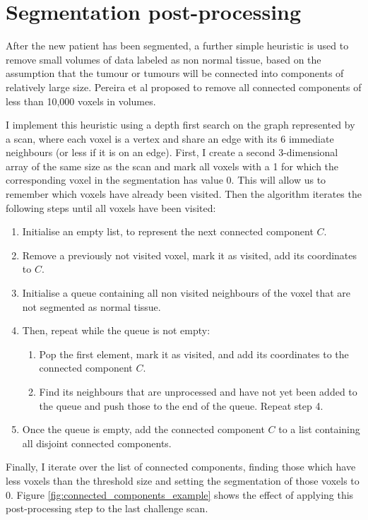 \documentclass[12pt,a4paper,twoside,openright]{report}
\begin{document}
\section{Segmentation post-processing}
After the new patient has been segmented, a further simple heuristic is used to remove small volumes of data labeled as non normal tissue, based on the assumption that the tumour or tumours will be connected into components of relatively large size. Pereira et al \cite{pereira} proposed to remove all connected components of less than 10,000 voxels in volumes.

I implement this heuristic using a depth first search on the graph represented by a scan, where each voxel is a vertex and share an edge with its 6 immediate neighbours (or less if it is on an edge). First, I create a second 3-dimensional array of the same size as the scan and mark all voxels with a 1 for which the corresponding voxel in the segmentation has value 0. This will allow us to remember which voxels have already been visited. Then the algorithm iterates the following steps until all voxels have been visited:
\begin{enumerate}
	\item Initialise an empty list, to represent the next connected component $C$.
	\item Remove a previously not visited voxel, mark it as visited, add its coordinates to $C$.
	\item Initialise a queue containing all non visited neighbours of the voxel that are not segmented as normal tissue.
	\item Then, repeat while the queue is not empty:
	\begin{enumerate}
		\item Pop the first element, mark it as visited, and add its coordinates to the connected component $C$.
		\item Find its neighbours that are unprocessed and have not yet been added to the queue and push those to the end of the queue. Repeat step 4.
	\end{enumerate}
	\item Once the queue is empty, add the connected component $C$ to a list containing all disjoint connected components.
\end{enumerate}
Finally, I iterate over the list of connected components, finding those which have less voxels than the threshold size and setting the segmentation of those voxels to 0. Figure \ref{fig:connected_components_example} shows the effect of applying this post-processing step to the last challenge scan.
\end{document}
